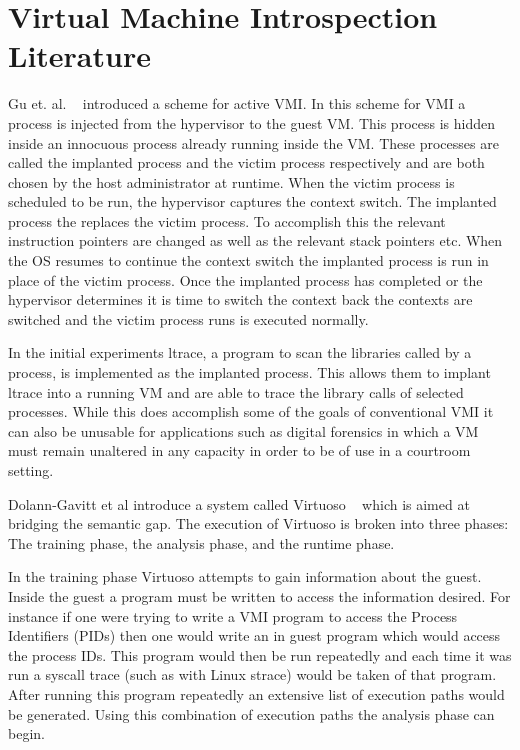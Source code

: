 \section{Virtual Machine Introspection Literature}

Gu et. al. ~\cite{gu_process_2011-1} introduced a scheme for active VMI. In this scheme for VMI a process is injected from the hypervisor to the guest VM. This process is hidden inside an innocuous process already running inside the VM. These processes are called the implanted process and the victim process respectively and are both chosen by the host administrator at runtime. When the victim process is scheduled to be run, the hypervisor captures the context switch. The implanted process the replaces the victim process. To accomplish this the relevant instruction pointers are changed as well as the relevant stack pointers etc. When the OS resumes to continue the context switch the implanted process is run in place of the victim process. Once the implanted process has completed or the hypervisor determines it is time to switch the context back the contexts are switched and the victim process runs is executed normally. 

In the initial experiments ltrace, a program to scan the libraries called by a process, is implemented as the implanted process. This allows them to implant ltrace into a running VM and are able to trace the library calls of selected processes. While this does accomplish some of the goals of conventional VMI it can also be unusable for applications such as digital forensics in which a VM must remain unaltered in any capacity in order to be of use in a courtroom setting. 

Dolann-Gavitt et al introduce a system called Virtuoso ~\cite{dolan-gavitt_virtuoso:_2011} which is aimed at bridging the semantic gap. The execution of Virtuoso is broken into three phases: The training phase, the analysis phase, and the runtime phase. 

In the training phase Virtuoso attempts to gain information about the guest. Inside the guest a program must be written to access the information desired. For instance if one were trying to write a VMI program to access the Process Identifiers (PIDs) then one would write an in guest program which would access the process IDs. This program would then be run repeatedly and each time it was run a syscall trace (such as with Linux strace) would be taken of that program.  After running this program repeatedly an extensive list of execution paths would be generated. Using this combination of execution paths the analysis phase can begin. 

